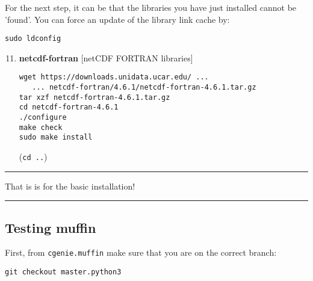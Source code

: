 \documentclass[10pt,twoside]{article}
\begin{document}
\noindent For the next step, it can be that the libraries you have just installed cannot be 'found'. You can force an update of the library link cache by:
\vspace{-2pt}
\begin{verbatim}
sudo ldconfig
\end{verbatim}

\newpage

\begin{enumerate}[noitemsep]
\setcounter{enumi}{10}

\item \textbf{netcdf-fortran} [netCDF FORTRAN libraries]

\vspace{-2pt}
\begin{verbatim}
wget https://downloads.unidata.ucar.edu/ ...
   ... netcdf-fortran/4.6.1/netcdf-fortran-4.6.1.tar.gz
tar xzf netcdf-fortran-4.6.1.tar.gz
cd netcdf-fortran-4.6.1
./configure
make check
sudo make install
\end{verbatim}
\vspace{-2pt}
(\texttt{cd ..})

\end{enumerate}

\vspace{1mm}\noindent\rule{4cm}{0.1mm}

\noindent That is is for the basic installation!

\vspace{-1mm}\noindent\rule{4cm}{0.1mm}

%
\subsection{Testing muffin}

First, from \texttt{cgenie.muffin} make sure that you are on the correct branch:
\vspace{-5pt}\begin{verbatim}
git checkout master.python3
\end{verbatim}\vspace{-5pt}
\end{document}
